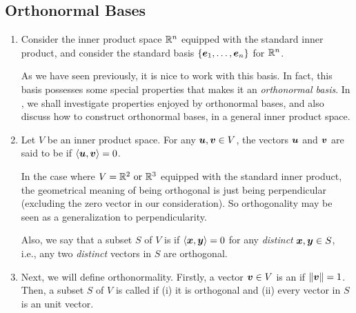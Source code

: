 \subsection{Orthonormal Bases}
\label{subsect:orthonormal-basis}
\begin{enumerate}
\item Consider the inner product space \(\mathbb{R}^n\) equipped with the standard
inner product, and consider the standard basis
\(\{\vb*{e}_1,\dotsc,\vb*{e}_n\}\) for \(\mathbb{R}^n\).

As we have seen previously, it is nice to work with this basis. In fact, this
basis possesses some special properties that makes it an \emph{orthonormal
basis}. In , we shall investigate properties
enjoyed by orthonormal bases, and also discuss how to construct orthonormal
bases, in a general inner product space.

\item Let \(V\) be an inner product space. For any \(\vb*{u},\vb*{v}\in V\),
the vectors \(\vb*{u}\) and \(\vb*{v}\) are said to be  if
\(\left\langle \vb*{u},\vb*{v}\right\rangle=0\).
\begin{note}
In the case where \(V=\mathbb{R}^2\text{ or }\mathbb{R}^3\) equipped with the standard inner
product, the geometrical meaning of being orthogonal is just being
perpendicular (excluding the zero vector in our consideration). So
orthogonality may be seen as a generalization to perpendicularity.
\end{note}

Also, we say that a subset \(S\) of \(V\) is  if
\(\left\langle \vb*{x},\vb*{y}\right\rangle=0\) for any \emph{distinct} \(\vb*{x},\vb*{y}\in
S\), i.e., any two \emph{distinct} vectors in \(S\) are orthogonal.


\item Next, we will define orthonormality. Firstly, a vector \(\vb*{v}\in V\)
is an  if \(\norm{\vb*{v}}=1\). Then, a subset \(S\) of
\(V\) is called  if (i) it is orthogonal and (ii) every
vector in \(S\) is an unit vector.


\end{enumerate}
